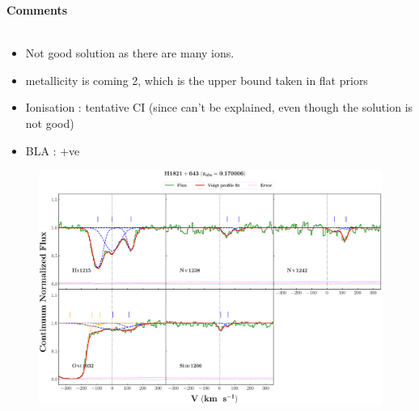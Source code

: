 \documentclass[12pt]{report}
\newcommand\ion[2]{\text{#1\,\textsc{\lowercase{#2}}}}
\begin{document}
\newpage

\textbf{Comments}
\\\\
\begin{itemize}
    \item Not good solution as there are many ions.
    \item metallicity is coming 2, which is the upper bound taken in flat priors
    \item Ionisation : tentative CI (since \ion{O}{vi} can't be explained, even though the solution is not good)
    \item BLA : +ve
\end{itemize}



\newpage

\begin{landscape}

\begin{figure}
    \centering
    \vspace{-20mm}
    \hspace*{-35mm}
    \includegraphics[width=1.25\linewidth]{System-Plots/H1821+643_z=0.170006_sys_plot.png}
\end{figure}

\end{landscape}
\end{document}
